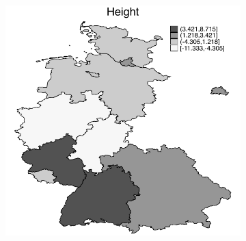 \documentclass[a4paper ]{article}
\begin{document}
    
    
    
    
    
    
    
    
    
    
    
    
    
    
    
    
    
    
\clearpage
\newpage
\begin{figure}[p]
\begin{subfigure}[h]{0.48\textwidth}\centering
	\includegraphics[width=\textwidth]{../../analysis/graphs/SOEP/LOCHeight.pdf}
\end{subfigure}
\quad
\begin{subfigure}[h]{0.48\textwidth}\centering

\end{subfigure}
\end{figure}
\end{document}
